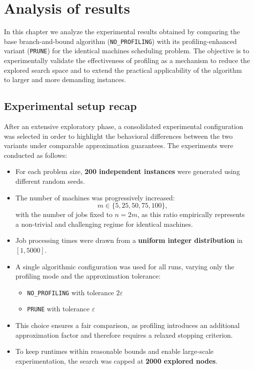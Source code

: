 \chapter{Analysis of results}
\label{ch:analysis}

In this chapter we analyze the experimental results obtained by comparing the base branch-and-bound algorithm (\texttt{NO\_PROFILING}) with its profiling-enhanced variant (\texttt{PRUNE}) for the identical machines scheduling problem.
The objective is to experimentally validate the effectiveness of profiling as a mechanism to reduce the explored search space and to extend the practical applicability of the algorithm to larger and more demanding instances.

\section{Experimental setup recap}

After an extensive exploratory phase, a consolidated experimental configuration was selected in order to highlight the behavioral differences between the two variants under comparable approximation guarantees.
The experiments were conducted as follows:

\begin{itemize}
  \item For each problem size, \textbf{200 independent instances} were generated using different random seeds.
  \item The number of machines was progressively increased:
  \[
    m \in \{5, 25, 50, 75, 100\},
  \]
  with the number of jobs fixed to \(n = 2m\), as this ratio empirically represents a non-trivial and challenging regime for identical machines.
  \item Job processing times were drawn from a \textbf{uniform integer distribution} in \([1, 5000]\).
  \item A single algorithmic configuration was used for all runs, varying only the profiling mode and the approximation tolerance:
  \begin{itemize}
    \item \texttt{NO\_PROFILING} with tolerance \(2\varepsilon\)
    \item \texttt{PRUNE} with tolerance \(\varepsilon\)
  \end{itemize}
  \item This choice ensures a fair comparison, as profiling introduces an additional approximation factor and therefore requires a relaxed stopping criterion.
  \item To keep runtimes within reasonable bounds and enable large-scale experimentation, the search was capped at \textbf{2000 explored nodes}.
\end{itemize}

